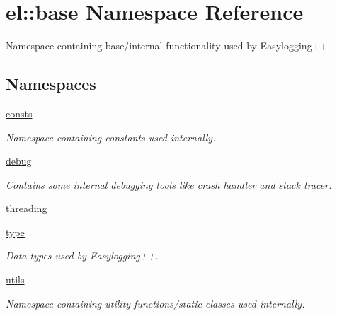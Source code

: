 \hypertarget{namespaceel_1_1base}{}\section{el\+:\+:base Namespace Reference}
\label{namespaceel_1_1base}


Namespace containing base/internal functionality used by Easylogging++.  


\subsection*{Namespaces}
\begin{DoxyCompactItemize}
\item 
 \hyperlink{namespaceel_1_1base_1_1consts}{consts}
\begin{DoxyCompactList}\small\item\em Namespace containing constants used internally. \end{DoxyCompactList}\item 
 \hyperlink{namespaceel_1_1base_1_1debug}{debug}
\begin{DoxyCompactList}\small\item\em Contains some internal debugging tools like crash handler and stack tracer. \end{DoxyCompactList}\item 
 \hyperlink{namespaceel_1_1base_1_1threading}{threading}
\item 
 \hyperlink{namespaceel_1_1base_1_1type}{type}
\begin{DoxyCompactList}\small\item\em Data types used by Easylogging++. \end{DoxyCompactList}\item 
 \hyperlink{namespaceel_1_1base_1_1utils}{utils}
\begin{DoxyCompactList}\small\item\em Namespace containing utility functions/static classes used internally. \end{DoxyCompactList}\end{DoxyCompactItemize}
